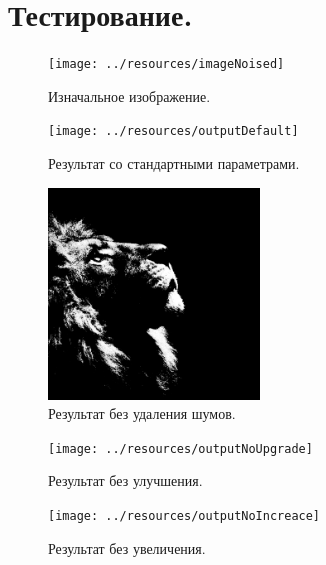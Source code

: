 \section{Тестирование.}

\begin{figure}[ht]
    \begin{center}
        \texttt{[image: ../resources/imageNoised]}
    \end{center}
    \caption{Изначальное изображение.}
\end{figure}

\begin{figure}[ht]
    \begin{center}
        \texttt{[image: ../resources/outputDefault]}
    \end{center}
    \caption{Результат со стандартными параметрами.}
\end{figure}

\begin{figure}[ht]
    \begin{center}
        \includegraphics[width=0.5\textwidth]{../resources/outputNoDenoise}
    \end{center}
    \caption{Результат без удаления шумов.}
\end{figure}

\begin{figure}[ht]
    \begin{center}
        \texttt{[image: ../resources/outputNoUpgrade]}
    \end{center}
    \caption{Результат без улучшения.}
\end{figure}

\begin{figure}[ht]
    \begin{center}
        \texttt{[image: ../resources/outputNoIncreace]}
    \end{center}
    \caption{Результат без увеличения.}
\end{figure}

